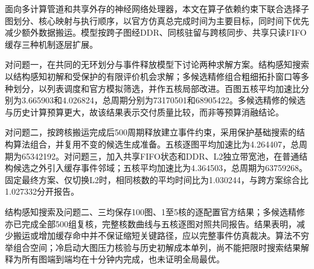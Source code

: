面向多计算管道和共享外存的神经网络处理器，本文在算子依赖约束下联合选择子图划分、核心映射与执行顺序，以官方仿真总完成时间为主要目标，同时间下优先减少额外数据搬运。模型按跨子图经DDR、同核驻留与跨核同步、共享只读FIFO缓存三种机制逐层扩展。

对问题一，在共同的无环划分与事件释放模型下讨论两种求解方案。结构感知搜索以结构感知初解和受保护的有限评价机会求解；多候选精修组合粗细拓扑窗口等多种划分，以列表调度和官方模拟筛选，并作五核局部改进。百图五核平均加速比分别为3.665903和4.026824，总周期分别为73170501和68905422。多候选精修的候选与历史计算预算更大，故该结果表示交付质量比较，而非等预算消融结论。

对问题二，按跨核搬运完成后500周期释放建立事件约束，采用保护基础搜索的结构算法组合，并复用不变的候选生成准备。五核逐图平均加速比为4.264407，总周期为65342192。对问题三，加入共享FIFO状态和DDR、L2独立带宽池，在普通结构候选之外引入缓存事件邻域；五核平均加速比为4.364503，总周期为63759268。固定最终方案、仅切换L2时，相同核数的平均时间比为1.030244，与跨方案综合比1.027332分开报告。

结构感知搜索及问题二、三均保存100图、1至5核的逐配置官方结果；多候选精修亦已完成全部500组复核，完整核数曲线与五核逐图对照共同报告。结果表明，减少搬运或增加缓存命中并不保证缩短关键路径，应以完整事件仿真裁决。算法不穷举组合空间；冷启动大图压力核验与历史初解成本单列，尚不能把限时搜索结果解释为所有图端到端均在十分钟内完成，也未证明全局最优。
